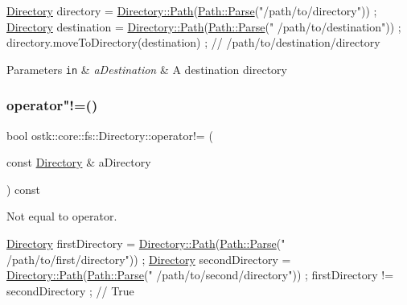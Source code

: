\begin{DoxyCode}
\hyperlink{classostk_1_1core_1_1fs_1_1_directory_adc893e10f55282be0d0455e9cfc5796b}{Directory} directory = \hyperlink{classostk_1_1core_1_1fs_1_1_directory_a0151dba2940d5f426b52209dc7dab2e5}{Directory::Path}(\hyperlink{classostk_1_1core_1_1fs_1_1_path_ad08539ba654f5df11c4bcb07276345ad}{Path::Parse}(\textcolor{stringliteral}{"/path/to/directory"}))
       ;
\hyperlink{classostk_1_1core_1_1fs_1_1_directory_adc893e10f55282be0d0455e9cfc5796b}{Directory} destination = \hyperlink{classostk_1_1core_1_1fs_1_1_directory_a0151dba2940d5f426b52209dc7dab2e5}{Directory::Path}(\hyperlink{classostk_1_1core_1_1fs_1_1_path_ad08539ba654f5df11c4bcb07276345ad}{Path::Parse}(\textcolor{stringliteral}{"
      /path/to/destination"})) ;
directory.moveToDirectory(destination) ; \textcolor{comment}{// /path/to/destination/directory}
\end{DoxyCode}



\begin{DoxyParams}[1]{Parameters}
\mbox{\tt in}  & {\em a\+Destination} & A destination directory \\
\hline
\end{DoxyParams}
\mbox{\label{classostk_1_1core_1_1fs_1_1_directory_adc10dae6abcacd9530cefcd1cdceb45b}} 
\subsubsection{\texorpdfstring{operator"!=()}{operator!=()}}
{\footnotesize\ttfamily bool ostk\+::core\+::fs\+::\+Directory\+::operator!= (\begin{DoxyParamCaption}\item[{const \hyperlink{classostk_1_1core_1_1fs_1_1_directory}{Directory} \&}]{a\+Directory }\end{DoxyParamCaption}) const}



Not equal to operator. 


\begin{DoxyCode}
\hyperlink{classostk_1_1core_1_1fs_1_1_directory_adc893e10f55282be0d0455e9cfc5796b}{Directory} firstDirectory = \hyperlink{classostk_1_1core_1_1fs_1_1_directory_a0151dba2940d5f426b52209dc7dab2e5}{Directory::Path}(\hyperlink{classostk_1_1core_1_1fs_1_1_path_ad08539ba654f5df11c4bcb07276345ad}{Path::Parse}(\textcolor{stringliteral}{"
      /path/to/first/directory"})) ;
\hyperlink{classostk_1_1core_1_1fs_1_1_directory_adc893e10f55282be0d0455e9cfc5796b}{Directory} secondDirectory = \hyperlink{classostk_1_1core_1_1fs_1_1_directory_a0151dba2940d5f426b52209dc7dab2e5}{Directory::Path}(\hyperlink{classostk_1_1core_1_1fs_1_1_path_ad08539ba654f5df11c4bcb07276345ad}{Path::Parse}(\textcolor{stringliteral}{"
      /path/to/second/directory"})) ;
firstDirectory != secondDirectory ; \textcolor{comment}{// True}
\end{DoxyCode}



